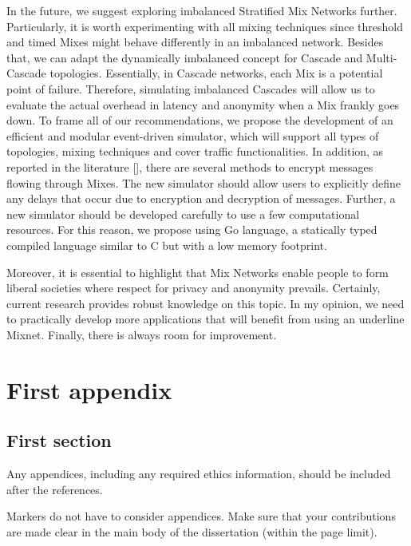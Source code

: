 \documentclass[logo,msc,cyber]{infthesis}   %
\begin{document}
In the future, we suggest exploring imbalanced Stratified Mix Networks further.
Particularly, it is worth experimenting with all mixing techniques since
threshold and timed Mixes might behave differently in an imbalanced network.
Besides that, we can adapt the dynamically imbalanced concept for Cascade and
Multi-Cascade topologies. Essentially, in Cascade networks, each Mix is a
potential point of failure. Therefore,  simulating imbalanced Cascades will
allow us to evaluate the actual overhead in latency and anonymity when a Mix
frankly goes down. To frame all of our recommendations, we propose
the development of an efficient and modular event-driven simulator, which will
support all types of topologies, mixing techniques and cover traffic
functionalities. In addition, as reported in the literature [], there are
several methods to encrypt messages flowing through Mixes. The new simulator
should allow users to explicitly define any delays that occur due to encryption
and decryption of messages. Further, a new simulator should be developed
carefully to use a few computational resources. For this reason, we propose
using Go language, a statically typed compiled language similar to C but with a
low memory footprint.

Moreover, it is essential to highlight that Mix Networks enable people to form
liberal societies where respect for privacy and anonymity prevails. Certainly,
current research provides robust knowledge on this topic. In my opinion, we need
to practically develop more applications that will benefit from using an
underline Mixnet. Finally, there is always room for improvement.





\appendix

\chapter{First appendix}

\section{First section}

Any appendices, including any required ethics information, should be included
after the references.

Markers do not have to consider appendices. Make sure that your contributions
are made clear in the main body of the dissertation (within the page limit).
\end{document}

